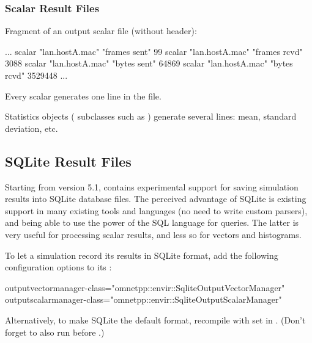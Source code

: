 \subsubsection{Scalar Result Files}
\label{sec:ana-sim:scalar-result-files}

Fragment of an output scalar file (without header):

\begin{filelisting}
...
scalar "lan.hostA.mac" "frames sent"  99
scalar "lan.hostA.mac" "frames rcvd"  3088
scalar "lan.hostA.mac" "bytes sent"   64869
scalar "lan.hostA.mac" "bytes rcvd"   3529448
...
\end{filelisting}

Every scalar generates one  line in the file.

Statistics objects ( subclasses such as )
generate several lines: mean, standard deviation, etc.



\subsection{SQLite Result Files}
\label{sec:ana-sim:sqlite-result-files}

Starting from version 5.1, {\opp} contains experimental support for
saving simulation results into SQLite database files. The perceived advantage
of SQLite is existing support in many existing tools and languages (no need to
write custom parsers), and being able to use the power of the SQL language
for queries. The latter is very useful for processing scalar results, and less
so for vectors and histograms.

To let a simulation record its results in SQLite format, add the following
configuration options to its :

\begin{inifile}
outputvectormanager-class="omnetpp::envir::SqliteOutputVectorManager"
outputscalarmanager-class="omnetpp::envir::SqliteOutputScalarManager"
\end{inifile}

\begin{note}
Alternatively, to make SQLite the default format, recompile {\opp} with
 set in .
(Don't forget to also run   before .)
\end{note}

